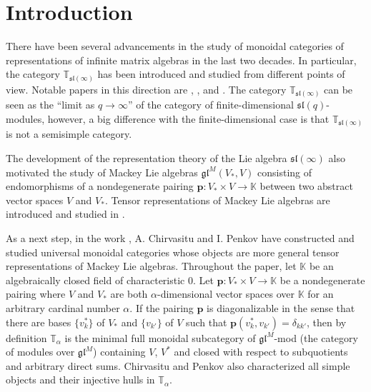\documentclass[openany, a4paper]{amsbook}
\theoremstyle{definition}
\numberwithin{equation}{chapter}
\begin{document}
\tableofcontents

\mainmatter
\chapter{Introduction}

There have been several advancements in the study of monoidal categories of representations of infinite matrix algebras in the last two decades. In particular, the category $\mathbb{T}_{\mathfrak{sl}(\infty)}$ has been introduced and studied from different points of view. Notable papers in this direction are \cite{dps}, \cite{ps11}, and \cite{ss}. The category $\mathbb{T}_{\mathfrak{sl}(\infty)}$ can be seen as the ``limit as $q \to \infty$'' of the category of finite-dimensional $\mathfrak{sl}(q)$-modules, however, a big difference with the finite-dimensional case is that $\mathbb{T}_{\mathfrak{sl}(\infty)}$ is not a semisimple category. 

The development of the representation theory of the Lie algebra $\mathfrak{sl}(\infty)$ also motivated the study of Mackey Lie algebras $\mathfrak{gl}^M(V_\ast, V)$ consisting of endomorphisms of a nondegenerate pairing $\mathbf{p}: V_\ast \times V \to \mathbb{K}$ between two abstract vector spaces $V$ and $V_\ast$. Tensor representations of Mackey Lie algebras are introduced and studied in \cite{ps14}.

As a next step, in the work \cite{cp17}, A. Chirvasitu and I. Penkov have constructed and studied universal monoidal categories whose objects are more general tensor representations of Mackey Lie algebras. Throughout the paper, let $\mathbb{K}$ be an algebraically closed field of characteristic 0. Let $\mathbf{p}:  V_\ast \times V \to \mathbb{K}$ be a nondegenerate pairing where $V$ and $V_\ast$ are both $\alpha$-dimensional vector spaces over $\mathbb{K}$ for an arbitrary cardinal number $\alpha$. If the pairing $\mathbf{p}$ is diagonalizable in the sense that there are bases $\{v^{\ast}_{k} \}$ of $V_\ast$ and $\{v_{k'} \}$ of $V$ such that $\mathbf{p}(v^{\ast}_{k}, v_{k'}) = \delta_{k k '}$, then by definition $\mathbb{T}_\alpha$ is the minimal full monoidal subcategory of $\mathfrak{gl}^M$-mod (the category of modules over $\mathfrak{gl}^M$) containing $V$, $V^\ast$ and closed with respect to subquotients and arbitrary direct sums. Chirvasitu and Penkov also characterized all simple objects and their injective hulls in $\mathbb{T}_\alpha$. 
\end{document}

